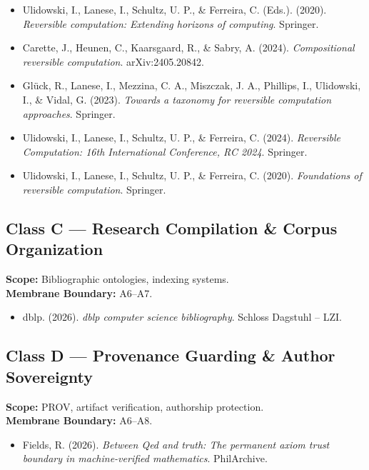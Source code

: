 \begin{itemize}
  \item Ulidowski, I., Lanese, I., Schultz, U. P., \& Ferreira, C. (Eds.). (2020). \textit{Reversible computation: Extending horizons of computing}. Springer.
  \item Carette, J., Heunen, C., Kaarsgaard, R., \& Sabry, A. (2024). \textit{Compositional reversible computation}. arXiv:2405.20842.
  \item Glück, R., Lanese, I., Mezzina, C. A., Miszczak, J. A., Phillips, I., Ulidowski, I., \& Vidal, G. (2023). \textit{Towards a taxonomy for reversible computation approaches}. Springer.
  \item Ulidowski, I., Lanese, I., Schultz, U. P., \& Ferreira, C. (2024). \textit{Reversible Computation: 16th International Conference, RC 2024}. Springer.
  \item Ulidowski, I., Lanese, I., Schultz, U. P., \& Ferreira, C. (2020). \textit{Foundations of reversible computation}. Springer.
\end{itemize}

\subsection*{Class C — Research Compilation \& Corpus Organization}
\textbf{Scope:} Bibliographic ontologies, indexing systems. \\
\textbf{Membrane Boundary:} A6–A7.

\begin{itemize}
  \item dblp. (2026). \textit{dblp computer science bibliography}. Schloss Dagstuhl – LZI.
\end{itemize}

\subsection*{Class D — Provenance Guarding \& Author Sovereignty}
\textbf{Scope:} PROV, artifact verification, authorship protection. \\
\textbf{Membrane Boundary:} A6–A8.

\begin{itemize}
  \item Fields, R. (2026). \textit{Between Qed and truth: The permanent axiom trust boundary in machine-verified mathematics}. PhilArchive.
\end{itemize}

